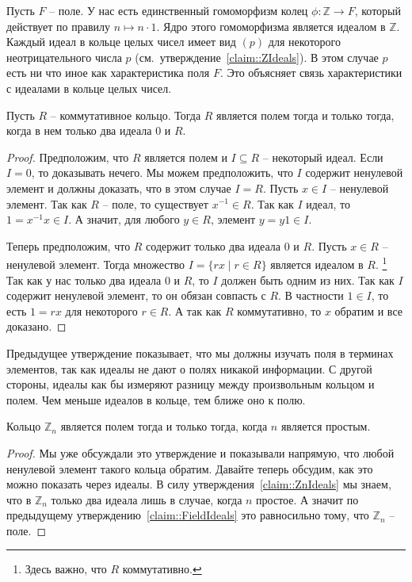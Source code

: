 \begin{remark}
Пусть $F$ -- поле.
У нас есть единственный гомоморфизм колец $\phi\colon \mathbb Z\to F$, который действует по правилу $n \mapsto n \cdot 1$.
Ядро этого гомоморфизма является идеалом в $\mathbb Z$.
Каждый идеал в кольце целых чисел имеет вид $(p)$ для некоторого неотрицательного числа $p$ (см.~утверждение~\ref{claim::ZIdeals}).
В этом случае $p$ есть ни что иное как характеристика поля $F$.
Это объясняет связь характеристики с идеалами в кольце целых чисел.
\end{remark}

\begin{claim}
\label{claim::FieldIdeals}
Пусть $R$ -- коммутативное кольцо.
Тогда $R$ является полем тогда и только тогда, когда в нем только два идеала $0$ и $R$.
\end{claim}
\begin{proof}
Предположим, что $R$ является полем и $I\subseteq R$ -- некоторый идеал.
Если $I = 0$, то доказывать нечего.
Мы можем предположить, что $I$ содержит ненулевой элемент и должны доказать, что в этом случае $I = R$.
Пусть $x\in I$ -- ненулевой элемент.
Так как $R$ -- поле, то существует $x^{-1}\in R$.
Так как $I$ идеал, то $1 =x^{-1}x\in I$.
А значит, для любого $y\in R$, элемент $y = y 1 \in I$.

Теперь предположим, что $R$ содержит только два идеала $0$ и $R$.
Пусть $x\in R$ -- ненулевой элемент.
Тогда множество $I = \{rx \mid r\in R\}$ является идеалом в $R$.%
\footnote{Здесь важно, что $R$ коммутативно.}
Так как у нас только два идеала $0$ и $R$, то $I$ должен быть одним из них.
Так как $I$ содержит ненулевой элемент, то он обязан совпасть с $R$.
В частности $1\in I$, то есть $1 = rx$ для некоторого $r\in R$.
А так как $R$ коммутативно, то $x$ обратим и все доказано.
\end{proof}

Предыдущее утверждение показывает, что мы должны изучать поля в терминах элементов, так как идеалы не дают о полях никакой информации.
С другой стороны, идеалы как бы измеряют разницу между произвольным кольцом и полем.
Чем меньше идеалов в кольце, тем ближе оно к полю.

\begin{claim}
\label{claim::ZpField}
Кольцо $\mathbb Z_n$ является полем тогда и только тогда, когда $n$ является простым.
\end{claim}
\begin{proof}
Мы уже обсуждали это утверждение и показывали напрямую, что любой ненулевой элемент такого кольца обратим.
Давайте теперь обсудим, как это можно показать через идеалы.
В силу утверждения~\ref{claim::ZnIdeals} мы знаем, что в $\mathbb Z_n$ только два идеала лишь в случае, когда $n$ простое.
А значит по предыдущему утверждению~\ref{claim::FieldIdeals} это равносильно тому, что $\mathbb Z_n$ -- поле.
\end{proof}

